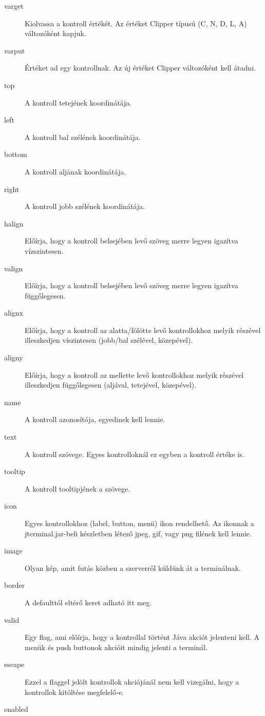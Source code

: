 \begin{description}
\item[varget]
    Kiolvassa a kontroll értékét. Az értéket Clipper típusú (C, N, D, L, A) 
    változóként kapjuk.
\item[varput]
    Értéket ad egy kontrollnak. Az új értéket Clipper változóként kell átadni.
\item[top]
    A kontroll tetejének koordinátája.
\item[left]  
    A kontroll bal szélének koordinátája.
\item[bottom]  
    A kontroll aljának koordinátája.
\item[right]  
    A kontroll jobb szélének koordinátája.
\item[halign]
    Előírja, hogy a kontroll belsejében levő szöveg merre legyen
    igazítva vízszintesen.
\item[valign]
    Előírja, hogy a kontroll belsejében levő szöveg merre legyen
    igazítva függőlegesen.
\item[alignx]
    Előírja, hogy a kontroll az alatta/fölötte levő kontrollokhoz
    melyik részével illeszkedjen víszintesen (jobb/bal szélével, közepével).
\item[aligny]
    Előírja, hogy a kontroll az mellette levő kontrollokhoz
    melyik részével illeszkedjen függőlegesen (aljával, tetejével, közepével).
\item[name]   
    A kontroll azonosítója, egyedinek kell lennie.
\item[text]  
    A kontroll szövege. Egyes kontrolloknál ez egyben a kontroll 
    értéke is.
\item[tooltip]    
    A kontroll tooltipjének a szövege.
\item[icon] 
    Egyes kontrollokhoz (label, button, menü) ikon rendelhető.
    Az ikonnak a jterminal.jar-beli készletben létező jpeg, gif,
    vagy png filének kell lennie.
\item[image] 
    Olyan kép, amit futás közben a szerverről küldünk át a terminálnak.
\item[border] 
    A defaulttól eltérő keret adható itt meg.
\item[valid]
    Egy flag, ami előírja, hogy a kontrollal történt Jáva akciót
    jelenteni kell. A menük és push buttonok akcióit mindig jelenti
    a terminál.
\item[escape]  
    Ezzel a flaggel jelölt kontrollok akciójánál nem kell vizsgálni,
    hogy a kontrollok kitöltése megfelelő-e.
\item[enabled]   

\end{description}
